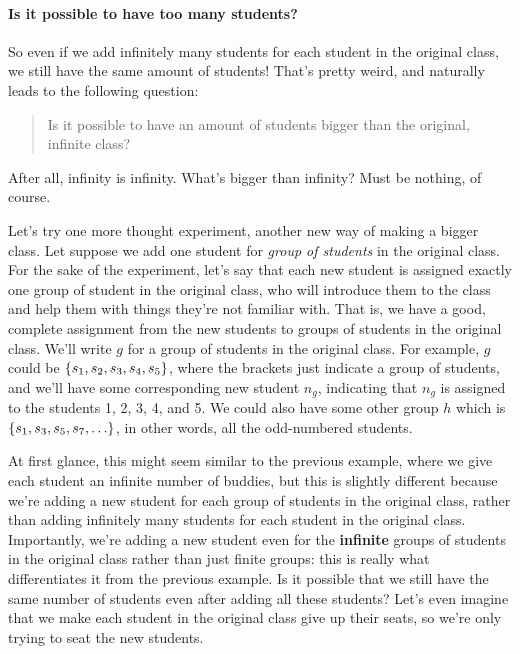 \paragraph{Is it possible to have too many students?}

So even if we add infinitely many students for each student in the original class, we still have the same amount of students!
That's pretty weird, and naturally leads to the following question:

\begin{quote}
    Is it possible to have an amount of students bigger than the original, infinite class?
\end{quote}

After all, infinity is infinity.
What's bigger than infinity?
Must be nothing, of course.

Let's try one more thought experiment, another new way of making a bigger class.
Let suppose we add one student for \emph{group of students} in the original class.
For the sake of the experiment, let's say that each new student is assigned exactly one group of student in the original class, who will introduce them to the class and help them with things they're not familiar with.
That is, we have a good, complete assignment from the new students to groups of students in the original class.
We'll write $g$ for a group of students in the original class.
For example, $g$ could be ${\left\{ {s_1, s_2, s_3, s_4, s_5} \right\}}$, where the brackets just indicate a group of students, and we'll have some corresponding new student $n_g$, indicating that $n_g$ is assigned to the students 1, 2, 3, 4, and 5.
We could also have some other group $h$ which is ${\left\{ {s_1, s_3, s_5, s_7, \ldots} \right\}}$, in other words, all the odd-numbered students.

At first glance, this might seem similar to the previous example, where we give each student an infinite number of buddies, but this is slightly different because we're adding a new student for each group of students in the original class, rather than adding infinitely many students for each student in the original class.
Importantly, we're adding a new student even for the \textbf{infinite} groups of students in the original class rather than just finite groups: this is really what differentiates it from the previous example.
Is it possible that we still have the same number of students even after adding all these students?
Let's even imagine that we make each student in the original class give up their seats, so we're only trying to seat the new students.

